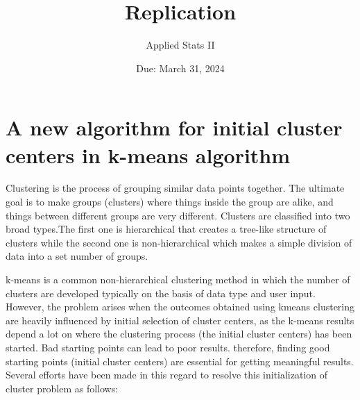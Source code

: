 \documentclass[12pt,letterpaper]{article}
\title{Replication}
\date{Due: March 31, 2024}
\author{Applied Stats II}
\begin{document}
	\maketitle
	\section*{A new algorithm for initial cluster centers in k-means algorithm}
	\vspace{.25cm}
\noindent Clustering is the process of grouping similar data points together. The ultimate goal is to make groups (clusters) where things inside the group are alike, and things between different groups are very different. Clusters are classified into two broad types.The first one is hierarchical that creates a tree-like structure of clusters while the second one is non-hierarchical which makes a simple division of data into a set number of groups.
\vspace{.25cm}

k-means is a common non-hierarchical clustering method in which the number of clusters are developed typically on the basis of data type and user input. However, the problem arises  when the outcomes obtained using kmeans clustering are heavily influenced by initial selection of cluster centers, as the k-means results depend a lot on where the clustering process (the initial cluster centers) has been started. Bad starting points can lead to poor results. therefore, finding good starting points (initial cluster centers) are essential for getting meaningful results. Several efforts have been made in this regard to resolve this initialization of cluster problem as follows:

\vspace{.5cm}
\end{document}
